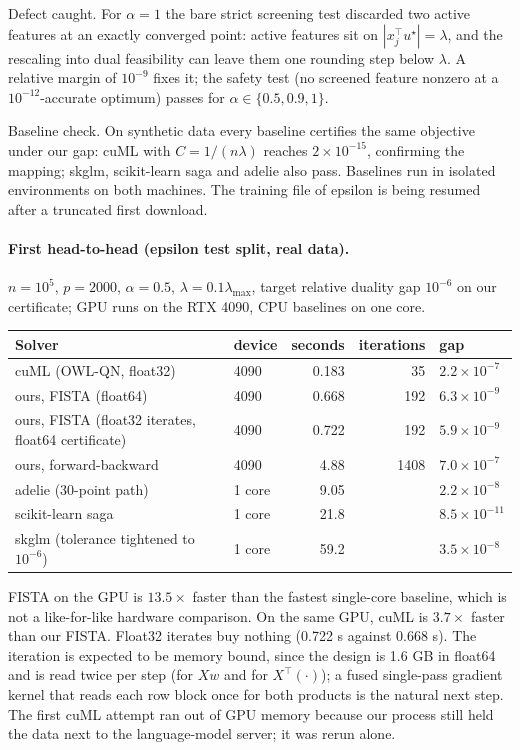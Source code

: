 Defect caught. For $\alpha=1$ the bare strict screening test discarded two
active features at an exactly converged point: active features sit on
$|x_j^\top u^\star| = \lambda$, and the rescaling into dual feasibility can leave
them one rounding step below $\lambda$. A relative margin of $10^{-9}$ fixes it;
the safety test (no screened feature nonzero at a $10^{-12}$-accurate optimum)
passes for $\alpha \in \{0.5, 0.9, 1\}$.

Baseline check. On synthetic data every baseline certifies the same
objective under our gap: cuML with $C = 1/(n\lambda)$ reaches $2\times10^{-15}$,
confirming the mapping; skglm, scikit-learn saga and adelie also pass.
Baselines run in isolated environments on both machines. The training file
of epsilon is being resumed after a truncated first download.

\paragraph{First head-to-head (epsilon test split, real data).}
$n=10^5$, $p=2000$, $\alpha=0.5$, $\lambda=0.1\lambda_{\max}$, target relative duality
gap $10^{-6}$ on our certificate; GPU runs on the RTX 4090, CPU baselines on
one core. 

\begin{center}
\small
\begin{tabular}{llrrl}
\toprule
Solver & device & seconds & iterations & gap \\
\midrule
cuML (OWL-QN, float32) & 4090 & 0.183 & 35 & $2.2\times10^{-7}$ \\
ours, FISTA (float64) & 4090 & 0.668 & 192 & $6.3\times10^{-9}$ \\
ours, FISTA (float32 iterates, float64 certificate) & 4090 & 0.722 & 192 & $5.9\times10^{-9}$ \\
ours, forward-backward & 4090 & 4.88 & 1408 & $7.0\times10^{-7}$ \\
adelie (30-point path) & 1 core & 9.05 & & $2.2\times10^{-8}$ \\
scikit-learn saga & 1 core & 21.8 & & $8.5\times10^{-11}$ \\
skglm (tolerance tightened to $10^{-6}$) & 1 core & 59.2 & & $3.5\times10^{-8}$ \\
\bottomrule
\end{tabular}
\end{center}

FISTA on the GPU is $13.5\times$ faster than the fastest single-core baseline,
which is not a like-for-like hardware comparison. On the same GPU, cuML is
$3.7\times$ faster than our FISTA. Float32 iterates buy nothing (0.722 s against
0.668 s). The iteration is expected to be memory bound, since the design is
1.6 GB in float64 and is read twice per step (for $Xw$ and for $X^\top(\cdot)$);
a fused single-pass gradient kernel that reads each row block once for both
products is the natural next step. The first cuML attempt ran out of GPU
memory because our process still held the data next to the language-model
server; it was rerun alone.

